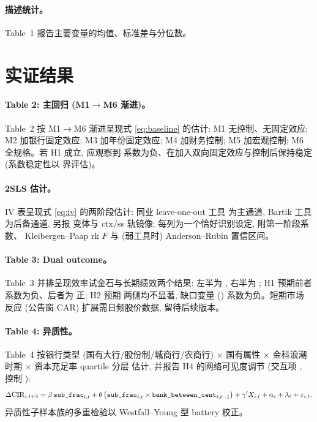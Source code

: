\paragraph{描述统计。}
Table~1 报告主要变量的均值、标准差与分位数。

\section{实证结果}\label{sec:results}

\paragraph{Table 2: 主回归 (M1$\to$M6 渐进)。}
Table~2 按 M1$\to$M6 渐进呈现式 \eqref{eq:baseline} 的估计:
M1 无控制、无固定效应; M2 加银行固定效应; M3 加年份固定效应;
M4 加财务控制; M5 加宏观控制; M6 全规格。若 H1 成立, 应观察到
 系数为负、在加入双向固定效应与控制后保持稳定
(系数稳定性以 \parencite{oster2019unobservable} 界评估)。

\paragraph{2SLS 估计。}
IV 表呈现式 \eqref{eq:iv} 的两阶段估计: 同业 leave-one-out 工具
为主通道, Bartik 工具为后备通道, 另报  变体与
ctx/ss 轨镜像; 每列为一个恰好识别设定, 附第一阶段系数、
Kleibergen--Paap rk $F$ 与 (弱工具时) Anderson--Rubin 置信区间。

\paragraph{Table 3: Dual outcome。}
Table~3 并排呈现效率试金石与长期绩效两个结果: 左半为
, 右半为
; H1 预期前者系数为负、后者为
正; H2 预期  两侧均不显著, 缺口变量
() 系数为负。短期市场
反应 (公告窗 CAR) 扩展需日频股价数据, 留待后续版本。

\paragraph{Table 4: 异质性。}
Table~4 按银行类型 (国有大行/股份制/城商行/农商行) $\times$
国有属性 $\times$ 金科浪潮时期 $\times$ 资本充足率 quartile 分层
估计, 并报告 H4 的网络可见度调节 (交互项 ,
控制 ):
\begin{equation}
\Delta \mathrm{CIR}_{i,t+3}
 = \beta\,\texttt{sub\_frac}_{i,t}
 + \theta\,\bigl(\texttt{sub\_frac}_{i,t}\times
   \texttt{bank\_between\_cent}_{i,t-1}\bigr)
 + \gamma' X_{i,t} + \alpha_i + \lambda_t + \varepsilon_{i,t}.
\label{eq:mod}
\end{equation}
异质性子样本族的多重检验以 Westfall--Young 型 battery 校正。

